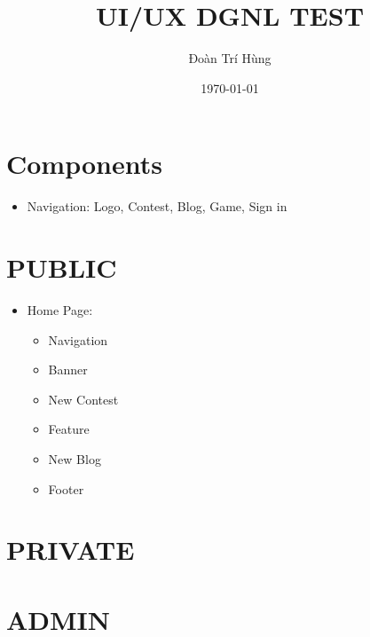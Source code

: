 \documentclass{article}
\title{\textbf{UI/UX DGNL TEST}}
\author{Đoàn Trí Hùng}
\date{\today} %
\begin{document}
\maketitle

\section*{Components}
\begin{itemize}
  \item Navigation: Logo, Contest, Blog, Game, Sign in
\end{itemize}
\section{PUBLIC}
\begin{itemize}
  \item Home Page:
  \begin{itemize}
    \item Navigation
    \item Banner
    \item New Contest
    \item Feature
    \item New Blog
    \item Footer
  \end{itemize}
\end{itemize} 


  

\section{PRIVATE}
\section{ADMIN}
\begingroup
\renewcommand{\section}[2]{}%
\begin{thebibliography}{}
\end{thebibliography}
\endgroup
\end{document}
